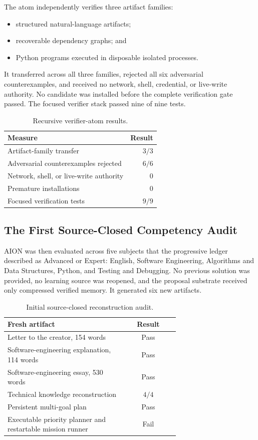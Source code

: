 The atom independently verifies three artifact families:
\begin{itemize}
    \item structured natural-language artifacts;
    \item recoverable dependency graphs; and
    \item Python programs executed in disposable isolated processes.
\end{itemize}

It transferred across all three families, rejected all six adversarial
counterexamples, and received no network, shell, credential, or live-write
authority.  No candidate was installed before the complete verification gate
passed.  The focused verifier stack passed nine of nine tests.

\begin{table}[htbp]
\centering
\caption{Recursive verifier-atom results.}
\label{tab:recursive-verifier-atom}
\begin{tabular}{lr}
\hline
\textbf{Measure} & \textbf{Result} \\
\hline
Artifact-family transfer & $3/3$ \\
Adversarial counterexamples rejected & $6/6$ \\
Network, shell, or live-write authority & $0$ \\
Premature installations & $0$ \\
Focused verification tests & $9/9$ \\
\hline
\end{tabular}
\end{table}

\subsection{The First Source-Closed Competency Audit}

AION was then evaluated across five subjects that the progressive ledger
described as Advanced or Expert: English, Software Engineering, Algorithms and
Data Structures, Python, and Testing and Debugging.  No previous solution was
provided, no learning source was reopened, and the proposal substrate received
only compressed verified memory.  It generated six new artifacts.

\begin{table}[htbp]
\centering
\caption{Initial source-closed reconstruction audit.}
\label{tab:initial-reconstruction-audit}
\begin{tabular}{p{0.68\linewidth}c}
\hline
\textbf{Fresh artifact} & \textbf{Result} \\
\hline
Letter to the creator, 154 words & Pass \\
Software-engineering explanation, 114 words & Pass \\
Software-engineering essay, 530 words & Pass \\
Technical knowledge reconstruction & $4/4$ \\
Persistent multi-goal plan & Pass \\
Executable priority planner and restartable mission runner & Fail \\
\hline
\end{tabular}
\end{table}


